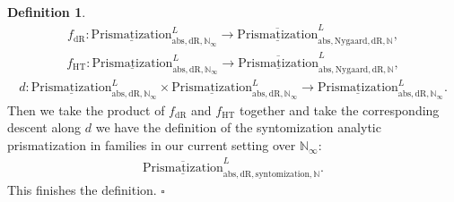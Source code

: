 \documentclass[12pt]{article}
\theoremstyle{definition}
\newtheorem{definition}{Definition}
\begin{document}
\begin{definition}
\begin{align}
f_\mathrm{dR}: {\underline{\mathrm{Prismatization}}}^L_{\mathrm{abs},\mathrm{dR},\mathbb{N}_\infty}\rightarrow \overline{\underline{\mathrm{Prismatization}}}^L_{\mathrm{abs},\mathrm{Nygaard},\mathrm{dR},\mathbb{N}},
\end{align}
\begin{align}
f_\mathrm{HT}: {\underline{\mathrm{Prismatization}}}^L_{\mathrm{abs},\mathrm{dR},\mathbb{N}_\infty}\rightarrow \overline{\underline{\mathrm{Prismatization}}}^L_{\mathrm{abs},\mathrm{Nygaard},\mathrm{dR},\mathbb{N}},
\end{align}
\begin{align}
d:  {\underline{\mathrm{Prismatization}}}^L_{\mathrm{abs},\mathrm{dR},\mathbb{N}_\infty}\times {\underline{\mathrm{Prismatization}}}^L_{\mathrm{abs},\mathrm{dR},\mathbb{N}_\infty} \rightarrow {\underline{\mathrm{Prismatization}}}^L_{\mathrm{abs},\mathrm{dR},\mathbb{N}_\infty}.
\end{align}
Then we take the product of $f_\mathrm{dR}$ and $f_\mathrm{HT}$ together and take the corresponding descent along $d$ we have the definition of the syntomization analytic prismatization in families in our current setting over $\mathbb{N}_\infty$:
\begin{align}
\overline{\underline{\mathrm{Prismatization}}}^L_{\mathrm{abs},\mathrm{dR},\mathrm{syntomization},\mathbb{N}}. 
\end{align}
This finishes the definition. $\square$
\end{definition}
\end{document}
